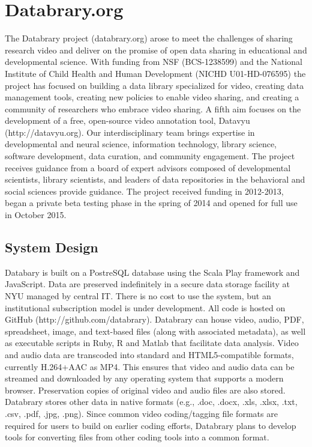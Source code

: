 \documentclass[letterpaper,man,apacite]{apa6}
\begin{document}
\section{Databrary.org}

The Databrary project (databrary.org) arose to meet the challenges of sharing research video and deliver on the promise of open data sharing in educational and developmental science.
With funding from NSF (BCS-1238599) and the National Institute of Child Health and Human Development (NICHD U01-HD-076595) the project has focused on building a data library specialized for video, creating data management tools, creating new policies to enable video sharing, and creating a community of researchers who embrace video sharing.
A fifth aim focuses on the development of a free, open-source video annotation tool, Datavyu (http://datavyu.org).
Our interdisciplinary team brings expertise in developmental and neural science, information technology, library science, software development, data curation, and community engagement. 
The project receives guidance from a board of expert advisors composed of developmental scientists, library scientists, and leaders of data repositories in the behavioral and social sciences provide guidance.
The project received funding in 2012-2013, began a private beta testing phase in the spring of 2014 and opened for full use in October 2015.

\subsection{System Design}

Databary is built on a PostreSQL database using the Scala Play framework and JavaScript.
Data are preserved indefinitely in a secure data storage facility at NYU managed by central IT.
There is no cost to use the system, but an institutional subscription model is under development.
All code is hosted on GitHub (http://github.com/databrary).
Databrary can house video, audio, PDF, spreadsheet, image, and text-based files (along with associated metadata), as well as executable scripts in Ruby, R and Matlab that facilitate data analysis.
Video and audio data are transcoded into standard and HTML5-compatible formats, currently H.264+AAC as MP4.
This ensures that video and audio data can be streamed and downloaded by any operating system that supports a modern browser.
Preservation copies of original video and audio files are also stored.
Databrary stores other data in native formats (e.g., .doc, .docx, .xls, .xlsx, .txt, .csv, .pdf, .jpg, .png).
Since common video coding/tagging file formats are required for users to build on earlier coding efforts, Databrary plans to develop tools for converting files from other coding tools into a common format.
\end{document}
